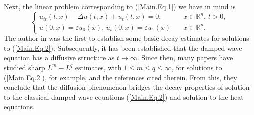 \documentclass[11pt,reqno]{amsart}
\begin{document}
Next, the linear problem corresponding to (\ref{Main.Eq.1}) we have in mind is
\begin{equation} \label{Main.Eq.2}
\begin{cases}
u_{tt}(t,x)-\Delta u(t,x)+ u_t(t,x)= 0, &\quad x\in \mathbb{R}^n,\, t > 0, \\
u(0,x) = \varepsilon u_0(x), \, u_t(0,x) = \varepsilon u_1(x) &\quad x\in \mathbb{R}^n.
\end{cases}
\end{equation}
The author in \cite{Matsumura1976} was the first to establish some basic decay estimates for solutions to (\ref{Main.Eq.2}). Subsequently, it has been established that the damped wave equation has a diffusive structure as $t \to \infty$. Since then, many papers have studied sharp $L^m-L^q$ estimates, with $1 \leq m \leq q \leq \infty$, for solutions to (\ref{Main.Eq.2}), for example, \cite{Nishihara2003, DabbiccoEbert2017, Ikeda2019} and the references cited therein.  From this, they conclude that the diffusion phenomenon bridges the
decay properties of solution to the classical damped wave equations (\ref{Main.Eq.2})
and solution to the heat equations.
\medskip
\end{document}
